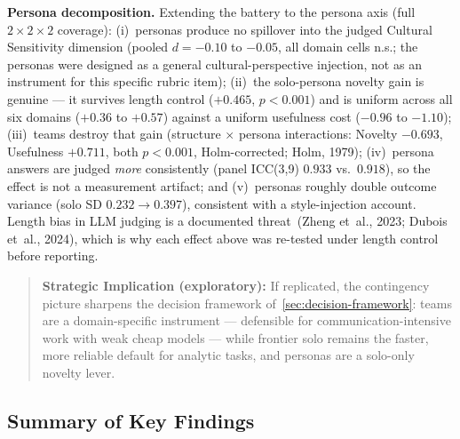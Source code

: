 \documentclass[12pt,a4paper]{article}
\begin{document}
\textbf{Persona decomposition.} Extending the battery to the persona axis
(full $2\times2\times2$ coverage): (i)~personas produce no spillover into the
judged Cultural Sensitivity dimension (pooled $d = -0.10$ to $-0.05$, all
domain cells n.s.; the personas were designed as a general cultural-perspective
injection, not as an instrument for this specific rubric item); (ii)~the
solo-persona novelty gain is genuine --- it survives length control
($+0.465$, $p < 0.001$) and is uniform across all six domains ($+0.36$ to
$+0.57$) against a uniform usefulness cost ($-0.96$ to $-1.10$); (iii)~teams
destroy that gain (structure $\times$ persona interactions: Novelty $-0.693$,
Usefulness $+0.711$, both $p < 0.001$, Holm-corrected; Holm, 1979);
(iv)~persona answers are judged \emph{more} consistently (panel ICC(3,9)
$0.933$ vs.\ $0.918$), so the effect is not a measurement artifact; and
(v)~personas roughly double outcome variance (solo SD $0.232 \to 0.397$),
consistent with a style-injection account. Length bias in LLM judging is a
documented threat~(Zheng et~al., 2023; Dubois et~al., 2024), which is why each
effect above was re-tested under length control before reporting.

\begin{quote}
\textbf{Strategic Implication (exploratory):} If replicated, the contingency
picture sharpens the decision framework of~\cref{sec:decision-framework}:
teams are a domain-specific instrument --- defensible for
communication-intensive work with weak cheap models --- while frontier solo
remains the faster, more reliable default for analytic tasks, and personas are
a solo-only novelty lever.
\end{quote}

\subsection{Summary of Key Findings}
\end{document}
